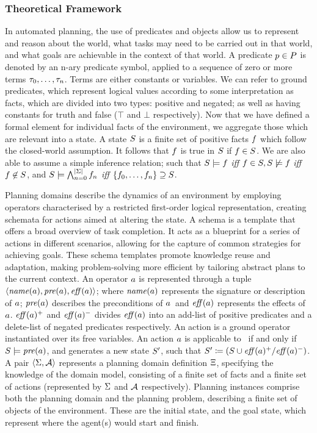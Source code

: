 \subsubsection{Theoretical Framework} 
In automated planning, the use of predicates and objects allow us to represent and reason about the world, what tasks may need to be carried out in that world, and what goals are achievable in the context of that world.
A predicate $p\in P$ is denoted by an n-ary predicate symbol, applied to a sequence of zero or more terms $\tau_0,\dots,\tau_n$. Terms are either constants or variables. We can refer to ground predicates, which represent logical values according to some interpretation as facts, which are divided into two types: positive and negated; as well as having constants for truth and false ($\top$ and $\bot$ respectively).
Now that we have defined a formal element for individual facts of the environment, we aggregate those which are relevant into a state.
A state $S$ is a finite set of positive facts $f$ which follow the closed-world assumption. It follows that $f$ is true in $S$ if $f\in S$. We are also able to assume a simple inference relation; such that $S\models f$ \textit{iff} $f\in S,S\not\models f$ \textit{iff} $f\not\in S$, and $S\models\bigwedge^{\left\lvert \Sigma \right\rvert}_{n=0}f_n$ \textit{iff} $\left\{f_0,\dots,f_n\right\}\supseteq S$.

Planning domains describe the dynamics of an environment by employing operators characterised by a restricted first-order logical representation, creating schemata for actions aimed at altering the state. A schema is a template that offers a broad overview of task completion. It acts as a blueprint for a series of actions in different scenarios, allowing for the capture of common strategies for achieving goals. These schema templates promote knowledge reuse and adaptation, making problem-solving more efficient by tailoring abstract plans to the current context.
An operator $a$ is represented through a tuple $\left\langle\mathit{name}(a),\mathit{pre}(a),\mathit{eff}(a)\right\rangle$; where $\mathit{name}(a)$ represents the signature or description of $a$; $\mathit{pre}(a)$ describes the preconditions of $a$~and $\mathit{eff}(a)$ represents the effects of~$a$. $\mathit{eff}(a)^+$ and $\mathit{eff}(a)^-$ divides $\mathit{eff}(a)$ into an add-list of positive predicates and a delete-list of negated predicates respectively. An action is a ground operator instantiated over its free variables. 
An action $a$ is applicable to \states~if and only if $S\models\mathit{pre}(a)$, and generates a new state $S'$, such that $S'\coloneqq(S\cup\mathit{eff}(a)^+/\mathit{eff}(a)^-)$. 
A pair $\left\langle\Sigma,\mathcal{A}\right\rangle$ represents a planning domain definition $\Xi$, specifying the knowledge of the domain model, consisting of a finite set of facts and a finite set of actions (represented by $\Sigma$ and $\mathcal{A}$ respectively).
Planning instances comprise both the planning domain and the planning problem, describing a finite set of objects of the environment. These are the initial state, and the goal state, which represent where the agent(s) would start and finish.

